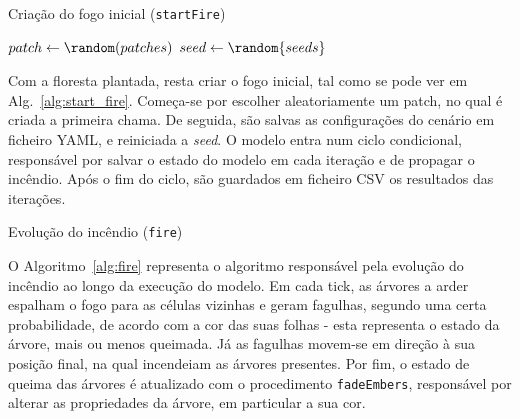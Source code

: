 \begin{algorithm}
    \caption{Criação do fogo inicial (\texttt{startFire})}\label{alg:start_fire}
    $patch \gets \random(patches)$\;
    \;
    \saveConfig{}\;
    $seed \gets \random{seeds}$\;
    \While{\anyTreesBurning{}}{
        \saveIteration{}\;
        \fire{}\;
    }
    \saveIterations{}\;
\end{algorithm}

Com a floresta plantada, resta criar o fogo inicial, tal como se pode ver em Alg.~\ref{alg:start_fire}. Começa-se por escolher aleatoriamente um patch, no qual é criada a primeira chama. De seguida, são salvas as configurações do cenário em ficheiro YAML, e reiniciada a \textit{seed}. O modelo entra num ciclo condicional, responsável por salvar o estado do modelo em cada iteração e de propagar o incêndio. Após o fim do ciclo, são guardados em ficheiro CSV os resultados das iterações.


\begin{algorithm}
    \caption{Evolução do incêndio (\texttt{fire})}\label{alg:fire}
    \fadeEmbers{}\;
    \tick{}\;
\end{algorithm}

O Algoritmo~\ref{alg:fire} representa o algoritmo responsável pela evolução do incêndio ao longo da execução do modelo. Em cada tick, as árvores a arder espalham o fogo para as células vizinhas e geram fagulhas, segundo uma certa probabilidade, de acordo com a cor das suas folhas - esta representa o estado da árvore, mais ou menos queimada. Já as fagulhas movem-se em direção à sua posição final, na qual incendeiam as árvores presentes. Por fim, o estado de queima das árvores é atualizado com o procedimento \texttt{fadeEmbers}, responsável por alterar as propriedades da árvore, em particular a sua cor.

